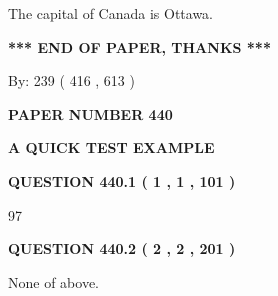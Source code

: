 \documentclass[12pt]{article}
\begin{document}
  
 
 
\noindent{}
 
 
The capital of Canada is Ottawa.
 
 
 
 
   
   
 \vspace{0.2in}
 
   
   
   
   
\vspace{1.0in} 
{\textbf{\large{ *** END OF PAPER, THANKS *** }}} 
   
   
\hspace{1.0in} By: 
 239 ( 416 ,  613 )
   
   
   
   
\newpage 
\setcounter{page}{ 
   440001 } 
   
   
   
   
 {\textbf{ \Large{ PAPER NUMBER  440  }}}
   
   
\vspace{0.2in}
   
   
   
   
   
   
 \vspace{0.2in}
{\LARGE {\textbf{ A QUICK TEST EXAMPLE}}}
   
   
  
\vspace{0.2in}
  
{\textbf{\Large{QUESTION
440.1 
 ( 1 , 1 , 101 )
}}}
  
  
 
 
\noindent{}

97
 
 
  
\vspace{0.2in}
  
{\textbf{\Large{QUESTION
440.2 
 ( 2 , 2 , 201 )
}}}
  
  
 
 
\noindent{}
 
 
 None of above.
 
\end{document}
